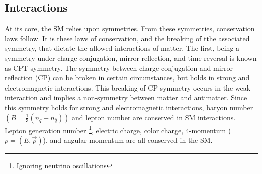 			\begin{table}[!thp]
			\centering
			\caption{Standard Model bosons and their properties ~\cite{pdg}}
			\label{tab:bosons}
			\end{table}

	\subsection{Interactions}\label{ssec:Interactions}

		At its core, the SM relies upon symmetries. From these symmetries, conservation laws follow. It is these laws of conservation, and the breaking of tthe associated symmetry, that dictate the allowed interactions of matter. The first, being a symmetry under charge conjugation, mirror reflection, and time reversal is known as CPT symmetry. The symmetry between charge conjugation and mirror reflection (CP) can be broken in certain circumstances, but holds in strong and electromagnetic interactions. This breaking of CP symmetry occurs in the weak interaction and implies a non-symmetry between matter and antimatter. Since this symmetry holds for strong and electromagnetic interactions, baryon number $(B = \frac{1}{3}(n_{q} - n_{\bar{q}}) )$ and lepton number are conserved in SM interactions. Lepton generation number \footnote{Ignoring neutrino oscillations}, electric charge, color charge, 4-momentum ($p=(E,\vec{p})$), and angular momentum are all conserved in the SM.

